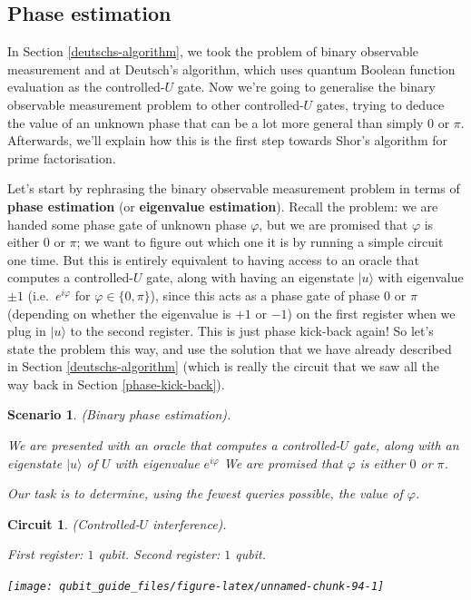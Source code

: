 \documentclass[fleqn,a4paper]{article}
\newtheorem*{scenario}{Scenario}
\newtheorem*{circuit}{Circuit}
\theoremstyle{definition}
\theoremstyle{definition}
\theoremstyle{definition}
\theoremstyle{definition}
\theoremstyle{remark}
\begin{document}
\hypertarget{phase-estimation}{%
\subsection{Phase estimation}\label{phase-estimation}}

In Section \ref{deutschs-algorithm}, we took the problem of binary observable measurement and at Deutsch's algorithm, which uses quantum Boolean function evaluation as the controlled-\(U\) gate.
Now we're going to generalise the binary observable measurement problem to other controlled-\(U\) gates, trying to deduce the value of an unknown phase that can be a lot more general than simply \(0\) or \(\pi\). Afterwards, we'll explain how this is the first step towards Shor's algorithm for prime factorisation.

Let's start by rephrasing the binary observable measurement problem in terms of \textbf{phase estimation} (or \textbf{eigenvalue estimation}).
Recall the problem: we are handed some phase gate of unknown phase \(\varphi\), but we are promised that \(\varphi\) is either \(0\) or \(\pi\); we want to figure out which one it is by running a simple circuit one time.
But this is entirely equivalent to having access to an oracle that computes a controlled-\(U\) gate, along with having an eigenstate \(|u\rangle\) with eigenvalue \(\pm1\) (i.e.~\(e^{i\varphi}\) for \(\varphi\in\{0,\pi\}\)), since this acts as a phase gate of phase \(0\) or \(\pi\) (depending on whether the eigenvalue is \(+1\) or \(-1\)) on the first register when we plug in \(|u\rangle\) to the second register.
This is just phase kick-back again!
So let's state the problem this way, and use the solution that we have already described in Section \ref{deutschs-algorithm} (which is really the circuit that we saw all the way back in Section \ref{phase-kick-back}).

\begin{scenario}

\emph{(Binary phase estimation).}

We are presented with an oracle that computes a controlled-\(U\) gate, along with an eigenstate \(|u\rangle\) of \(U\) with eigenvalue \(e^{i\varphi}\)
We are promised that \(\varphi\) is either \(0\) or \(\pi\).

Our task is to determine, using the fewest queries possible, the value of \(\varphi\).

\end{scenario}

\begin{circuit}

\emph{(Controlled-\(U\) interference).}

First register: \(1\) qubit. Second register: \(1\) qubit.

\begin{center}\texttt{[image: qubit\_guide\_files/figure-latex/unnamed-chunk-94-1]} \end{center}

\end{circuit}
\end{document}
